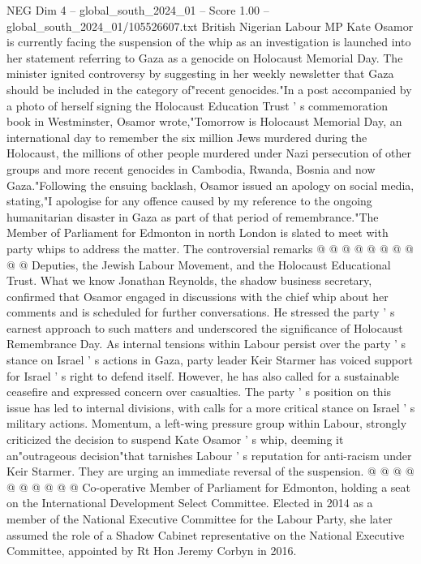 \begin{textsample}{NEG Dim 4 – global\_south\_2024\_01 – Score 1.00 – global\_south\_2024\_01/105526607.txt}  \label{ex:f4_neg_084}
British Nigerian Labour MP Kate Osamor is currently facing the suspension of the whip as an investigation is launched into her statement referring to Gaza as a genocide on Holocaust Memorial Day.
The minister ignited controversy by suggesting in her weekly newsletter that Gaza should be included in the category of"recent genocides."In a post accompanied by a photo of herself signing the Holocaust Education Trust ' s commemoration book in Westminster, Osamor wrote,"Tomorrow is Holocaust Memorial Day, an international day to remember the six million Jews murdered during the Holocaust, the millions of other people murdered under Nazi persecution of other groups and more recent genocides in Cambodia, Rwanda, Bosnia and now Gaza."Following the ensuing backlash, Osamor issued an apology on social media, stating,"I apologise for any offence caused by my reference to the ongoing humanitarian disaster in Gaza as part of that period of remembrance."The Member of Parliament for Edmonton in north London is slated to meet with party whips to address the matter.
The controversial remarks @ @ @ @ @ @ @ @ @ @ Deputies, the Jewish Labour Movement, and the Holocaust Educational Trust.
What we know Jonathan Reynolds, the shadow business secretary, confirmed that Osamor engaged in discussions with the chief whip about her comments and is scheduled for further conversations.
He stressed the party ' s earnest approach to such matters and underscored the significance of Holocaust Remembrance Day.
As internal tensions within Labour persist over the party ' s stance on Israel ' s actions in Gaza, party leader Keir Starmer has voiced support for Israel ' s right to defend itself.
However, he has also called for a sustainable ceasefire and expressed concern over casualties.
The party ' s position on this issue has led to internal divisions, with calls for a more critical stance on Israel ' s military actions.
Momentum, a left-wing pressure group within Labour, strongly criticized the decision to suspend Kate Osamor ' s whip, deeming it an"outrageous decision"that tarnishes Labour ' s reputation for anti-racism under Keir Starmer.
They are urging an immediate reversal of the suspension. @ @ @ @ @ @ @ @ @ @ Co-operative Member of Parliament for Edmonton, holding a seat on the International Development Select Committee.
Elected in 2014 as a member of the National Executive Committee for the Labour Party, she later assumed the role of a Shadow Cabinet representative on the National Executive Committee, appointed by Rt Hon Jeremy Corbyn in 2016.

\end{textsample}

